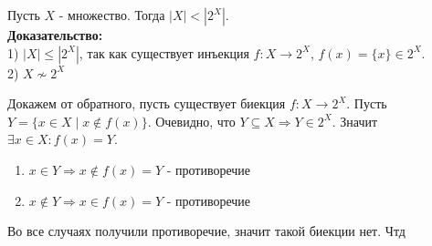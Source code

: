 Пусть $X$ - множество. Тогда $|X| < |2^X|$.\\

\noindent \textbf{Доказательство:}\\

1) $|X| \leq |2^X|$, так как существует инъекция $f : X \to 2^X$, $f(x) = \{x\} \in 2^X$.\\

2) $X \not \sim 2^X$

Докажем от обратного, пусть существует биекция $f : X \to 2^X$. Пусть $Y = \{x \in X \mid x \notin f(x)\}$. Очевидно, что
$Y \subseteq X \Rightarrow Y \in 2^X$. Значит $\exists x \in X : f(x) = Y$.

\begin{enumerate}
    \item $x \in Y \Rightarrow x \notin f(x) = Y$ - противоречие
    \item $x \notin Y \Rightarrow x \in f(x) = Y$ - противоречие
\end{enumerate}

Во все случаях получили противоречие, значит такой биекции нет. Чтд
